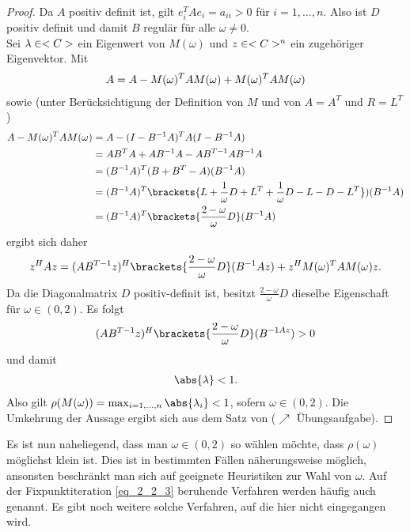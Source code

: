 \begin{proof}
	Da $A$ positiv definit ist, gilt $e_i^TA e_i = a_{ii} > 0$ für $i = 1, \dots, n$. Also ist $D$ positiv definit und damit $B$ regulär für alle $\omega \neq 0$.\\
	Sei $\lambda \in <C>$ ein Eigenwert von $M(\omega)$ und $z \in <C>^n$ ein zugehöriger Eigenvektor. Mit
	\begin{align}
		A = A - M(\omega)^T AM(\omega) + M(\omega)^T AM(\omega) \notag
	\end{align}
	sowie (unter Berücksichtigung der Definition von $M$ und von $A = A^T$ und $R = L^T$)
	\begin{align}
	A - M(\omega)^T AM(\omega) 
	&= A - (I - B^{-1}A)^T A(I-B^{-1}A)\notag\\
	&= AB^T A + AB^{-1}A - AB^{T-1}AB^{-1}A\notag\\
	&= (B^{-1}A)^T (B + B^T - A)(B^{-1}A)\notag\\
	&= (B^{-1}A)^T \brackets{L + \frac{1}{\omega}D + L^T + \frac{1}{\omega}D - L - D - L^T})(B^{-1}A)\notag\\
	&= (B^{-1}A)^T\brackets{\frac{2 -\omega}{\omega}D}(B^{-1}A)\notag
	\end{align}
	ergibt sich daher
	\begin{align}
		z^H Az = (AB^{T-1}z)^H\brackets{\frac{2 -\omega}{\omega}D}(B^{-1}Az) + z^H M(\omega)^T AM(\omega)z.\notag
	\end{align}
	Da die Diagonalmatrix $D$ positiv-definit ist, besitzt $\frac{2-\omega}{\omega}D$ dieselbe Eigenschaft für $\omega \in (0,2)$. Es folgt
	\begin{align}
		(AB^{T-1}z)^H \brackets{\frac{2 -\omega}{\omega}D} (B^{-1 Az}) > 0 \notag
	\end{align}
	und damit
	\begin{align}
		\abs{\lambda} < 1.
	\end{align}
	Also gilt $\rho(M(\omega)) = \max_{i = 1,\dots,n}\abs{\lambda_i} < 1$, sofern $\omega \in (0,2)$. Die Umkehrung der Aussage ergibt sich aus dem Satz von  ($\nearrow$ Übungsaufgabe). %
\end{proof}

Es ist nun naheliegend, dass man $\omega \in(0,2)$ so wählen möchte, dass $\rho(\omega)$ möglichst klein ist. Dies ist in bestimmten Fällen näherungsweise möglich, ansonsten beschränkt man sich auf geeignete Heuristiken zur Wahl von $\omega$. Auf der Fixpunktiteration \cref{eq_2_2_3} beruhende Verfahren werden häufig auch  genannt. Es gibt noch weitere solche Verfahren, auf die hier nicht eingegangen wird.
